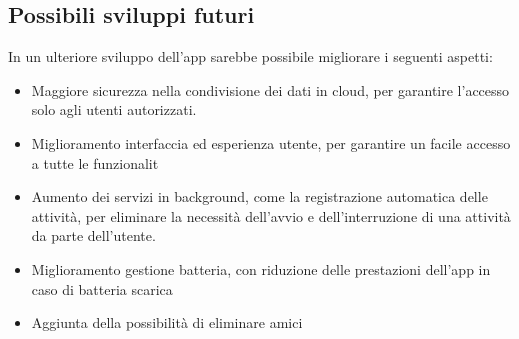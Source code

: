 \documentclass{article}
\begin{document}
    \subsection*{Possibili sviluppi futuri}
    In un ulteriore sviluppo dell'app sarebbe possibile migliorare i seguenti aspetti:
    \begin{itemize}
        \renewcommand{\labelitemi}{-}
        \item Maggiore sicurezza nella condivisione dei dati in cloud, per garantire l'accesso solo agli utenti autorizzati.
        \item Miglioramento interfaccia ed esperienza utente, per garantire un facile accesso a tutte le funzionalit
        \item Aumento dei servizi in background, come la registrazione automatica delle attività, per eliminare la necessità dell'avvio e dell'interruzione di una attività da parte dell'utente.
        \item Miglioramento gestione batteria, con riduzione delle prestazioni dell'app in caso di batteria scarica
        \item Aggiunta della possibilità di eliminare amici
    \end{itemize}
\end{document}

